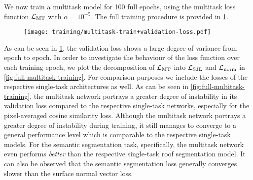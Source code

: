 \clearpage\noindent
We now train a multitask model for 100 full epochs, using the multitask loss function $\mathcal{L}_{\mathrm{MT}}$ with $\alpha = 10^{-5}$.
The full training procedure is provided in \cref{fig:multitask-training}.
%
\begin{figure}[H]
  \centering
  \texttt{[image: training/multitask-train+validation-loss.pdf]}
  \label{fig:multitask-training}
\end{figure}
\noindent
As can be seen in \cref{fig:multitask-training}, the validation loss shows a large degree of variance from epoch to epoch.
In order to investigate the behaviour of the loss function over each training epoch, we plot the decomposition of $\mathcal{L}_{\mathrm{MT}}$ into $\mathcal{L}_{\mathrm{SJL}}$ and $\mathcal{L}_{\mathrm{norm}}$ in \cref{fig:full-multitask-training}.
For comparison purposes we include the losses of the respective single-task architectures as well.
As can be seen in \cref{fig:full-multitask-training}, the multitask network portrays a greater degree of instability in its validation loss compared to the respective single-task networks, especially for the pixel-averaged cosine similarity loss.
Although the multitask network portrays a greater degree of instability during training, it still manages to converge to a general performance level which is comparable to the respective single-task models.
For the semantic segmentation task, specifically, the multitask network even performs \emph{better} than the respective single-task roof segmentation model.
It can also be observed that the semantic segmentation loss generally converges slower than the surface normal vector loss.
%
